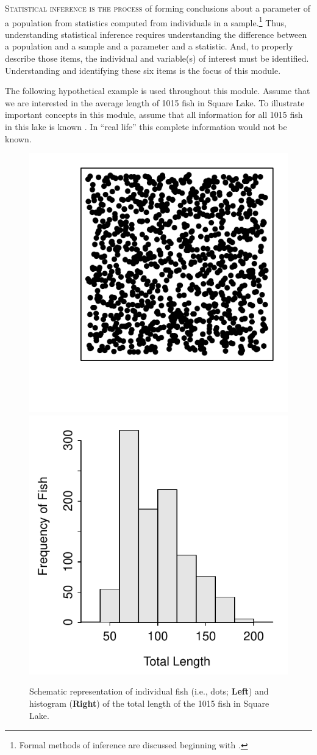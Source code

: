 \documentclass[10pt,openany]{book}\usepackage[]{graphicx}\usepackage[]{color}
\newenvironment{knitrout}{}{} %
\begin{document}
\minitoc
\newpage

\lettrine{S}{tatistical inference is the process} of forming conclusions about a parameter of a population from statistics computed from individuals in a sample.\footnote{Formal methods of inference are discussed beginning with .} Thus, understanding statistical inference requires understanding the difference between a population and a sample and a parameter and a statistic. And, to properly describe those items, the individual and variable(s) of interest must be identified. Understanding and identifying these six items is the focus of this module.

The following hypothetical example is used throughout this module. Assume that we are interested in the average length of 1015 fish in Square Lake. To illustrate important concepts in this module, assume that all information for all 1015 fish in this lake is known . In ``real life'' this complete information would not be known.

\begin{knitrout}
\color{fgcolor}\begin{figure}[hbtp]

{\centering \includegraphics[width=.4\linewidth]{Figs/SquareLakePopn-1} 
\includegraphics[width=.4\linewidth]{Figs/SquareLakePopn-2} 

}

\caption[Schematic representation of individual fish (i.e., dots]{Schematic representation of individual fish (i.e., dots; \textbf{Left}) and histogram (\textbf{Right}) of the total length of the 1015 fish in Square Lake.}\label{fig:SquareLakePopn}
\end{figure}


\end{knitrout}
\end{document}
